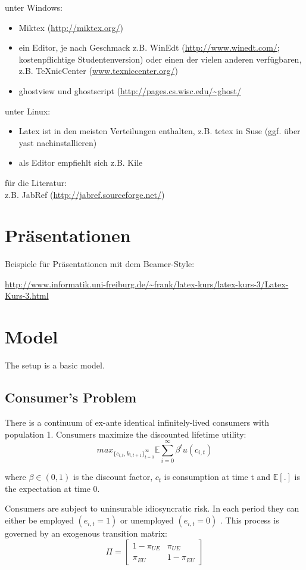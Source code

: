 \documentclass[a4paper,12pt]{article}
\begin{document}
unter Windows:
\begin{itemize}
   \item Miktex (\url{http://miktex.org/})
   \item ein Editor, je nach Geschmack z.B. WinEdt (\url{http://www.winedt.com/}; kostenpflichtige Studentenversion) oder einen der vielen anderen verf\"ugbaren, z.B. TeXnicCenter (\url{www.texniccenter.org/})
   \item ghostview und ghostscript (\url{http://pages.cs.wisc.edu/~ghost/}
\end{itemize}
unter Linux:
\begin{itemize}
   \item Latex ist in den meisten Verteilungen enthalten, z.B. tetex in Suse (ggf. \"uber yast nachinstallieren)
   \item als Editor empfiehlt sich z.B. Kile
\end{itemize}
f\"ur die Literatur:\\
z.B. JabRef (\url{http://jabref.sourceforge.net/})


\section{Pr\"asentationen}

Beispiele f\"ur Pr\"asentationen mit dem Beamer-Style:

\url{http://www.informatik.uni-freiburg.de/~frank/latex-kurs/latex-kurs-3/Latex-Kurs-3.html}

\section{Model}

The setup is a basic \cite{aiyagari} model. 

\subsection{Consumer's Problem}

There is a continuum of ex-ante identical infinitely-lived consumers with population 1. Consumers maximize the discounted lifetime utility: 
\[ 
 max_{\{{ c_{i,t}, k_{i,t+1} }\}_{t = 0}^{\infty}} {\mathbb{E}} \sum_{i=0}^{\infty} \beta^{t}  u(c_{i,t}) 
 \]

where $\beta \in (0,1)$ is the discount factor, $ c_{t}$ is consumption at time t and $\mathbb{E[.]}$ is the expectation at time 0. 

Consumers are subject to uninsurable idiosyncratic risk. In each period they can either be employed $(e_{i,t}=1)$ or unemployed $(e_{i,t}=0)$ . This process is governed by an exogenous transition matrix:
\[ \Pi = \begin{bmatrix}
1-\pi_{UE} & \pi_{UE} \\
 \pi_{EU} & 1-\pi_{EU}
\end{bmatrix}
\]
\end{document}
